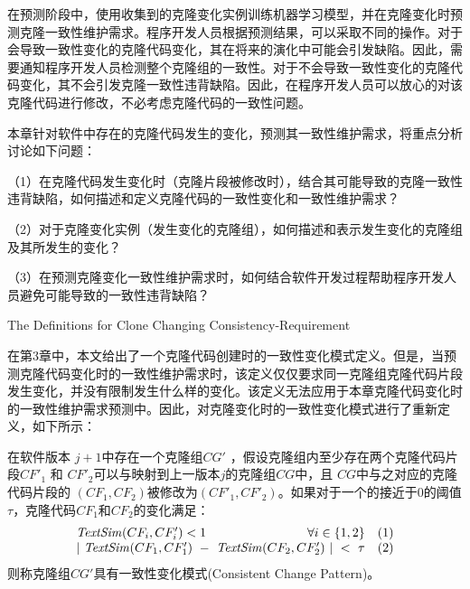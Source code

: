 在预测阶段中，使用收集到的克隆变化实例训练机器学习模型，并在克隆变化时预测克隆一致性维护需求。程序开发人员根据预测结果，可以采取不同的操作。对于会导致一致性变化的克隆代码变化，其在将来的演化中可能会引发缺陷。因此，需要通知程序开发人员检测整个克隆组的一致性。对于不会导致一致性变化的克隆代码变化，其不会引发克隆一致性违背缺陷。因此，在程序开发人员可以放心的对该克隆代码进行修改，不必考虑克隆代码的一致性问题。

本章针对软件中存在的克隆代码发生的变化，预测其一致性维护需求，将重点分析讨论如下问题：

（1）在克隆代码发生变化时（克隆片段被修改时），结合其可能导致的克隆一致性违背缺陷，如何描述和定义克隆代码的一致性变化和一致性维护需求？

（2）对于克隆变化实例（发生变化的克隆组），如何描述和表示发生变化的克隆组及其所发生的变化？

（3）在预测克隆变化一致性维护需求时，如何结合软件开发过程帮助程序开发人员避免可能导致的一致性违背缺陷？%


{The Definitions for Clone Changing Consistency-Requirement}

在第3章中，本文给出了一个克隆代码创建时的一致性变化模式定义。但是，当预测克隆代码变化时的一致性维护需求时，该定义仅仅要求同一克隆组克隆代码片段发生变化，并没有限制发生什么样的变化。该定义无法应用于本章克隆代码变化时的一致性维护需求预测中。因此，对克隆变化时的一致性变化模式进行了重新定义，如下所示：

\begin{definition}[克隆变化时一致性变化模式] 
\label{def-changingpattern}
在软件版本 $j+1$中存在一个克隆组$CG'$ ，假设克隆组内至少存在两个克隆代码片段$CF'_1$ 和 $CF'_2$可以与映射到上一版本$j$的克隆组$CG$中，且 $CG$中与之对应的克隆代码片段的 $(CF_1,CF_2)$被修改为$(CF'_1,CF'_2)$。如果对于一个的接近于0的阈值$\tau$，克隆代码$CF_1$和$CF_2$的变化满足：
\begin{equation}
\begin{split}
  \begin{array}[t]{crl}
    \mathit{TextSim}(CF_i, CF'_i) < 1 & \forall i \in \{1,2\} &(1) \\
    \multicolumn{2}{c}{| ~\mathit{TextSim}(CF_1,CF'_1)  ~-~ \mathit{TextSim}(CF_2,CF'_2) ~| ~< ~ \tau}  & (2)
  \end{array}
\end{split}
\end{equation}
则称克隆组$CG'$具有一致性变化模式(Consistent Change Pattern)。
\end{definition}

